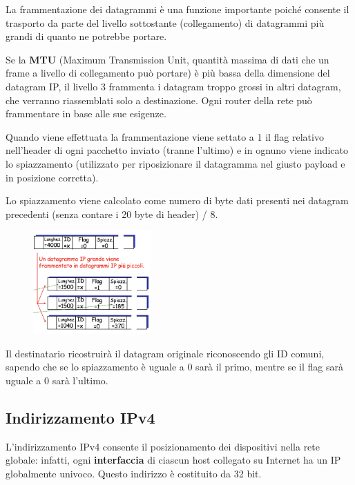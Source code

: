 \documentclass{report}
\begin{document}
La frammentazione dei datagrammi è una funzione importante poiché
consente il trasporto da parte del livello sottostante (collegamento) di
datagrammi più grandi di quanto ne potrebbe portare.

Se la \textbf{MTU} (Maximum Transmission Unit, quantità massima di dati
che un frame a livello di collegamento può portare) è più bassa della
dimensione del datagram IP, il livello 3 frammenta i datagram troppo
grossi in altri datagram, che verranno riassemblati solo a destinazione.
Ogni router della rete può frammentare in base alle sue esigenze.

Quando viene effettuata la frammentazione viene settato a 1 il flag
relativo nell'header di ogni pacchetto inviato (tranne l'ultimo) e in
ognuno viene indicato lo spiazzamento (utilizzato per riposizionare il
datagramma nel giusto payload e in posizione corretta).

Lo spiazzamento viene calcolato come numero di byte dati presenti nei datagram precedenti (senza contare i 20 byte di header) / 8.

\begin{figure}
		\centering
		\includegraphics[width=0.4\textwidth]{frammentazione}
		\vspace{-30pt}
	\end{figure}

Il destinatario ricostruirà il datagram originale riconoscendo gli ID
comuni, sapendo che se lo spiazzamento è uguale a 0 sarà il primo,
mentre se il flag sarà uguale a 0 sarà l'ultimo.

\hypertarget{header-n97}{%
\subsection{Indirizzamento IPv4}\label{header-n97}}

L'indirizzamento IPv4 consente il posizionamento dei dispositivi nella
rete globale: infatti, ogni \textbf{interfaccia} di ciascun host
collegato su Internet ha un IP globalmente univoco. Questo indirizzo è
costituito da 32 bit.
\end{document}
